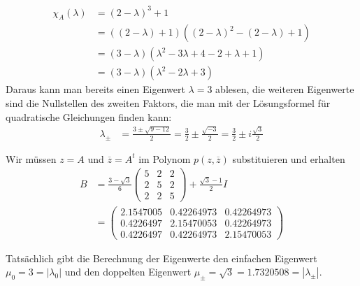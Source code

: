 \begin{loesung}
\begin{teilaufgaben}
\begin{align*}
\chi_A(\lambda)
&=
(2-\lambda)^3+1
\\
&=
((2-\lambda)+1)
((2-\lambda)^2 -(2-\lambda)+1)
\\
&=
(3-\lambda)
(\lambda^2-3\lambda +4-2+\lambda +1)
\\
&=
(3-\lambda)
(\lambda^2-2\lambda +3)
\end{align*}
Daraus kann man bereits einen Eigenwert $\lambda=3$ ablesen,
die weiteren Eigenwerte sind die Nullstellen des zweiten Faktors, die
man mit der Lösungsformel für quadratische Gleichungen finden kann:
\begin{align*}
\lambda_{\pm}
&=
\frac{3\pm\sqrt{9-12}}{2}
=
\frac{3}{2} \pm\frac{\sqrt{-3}}{2}
=
\frac{3}{2} \pm i\frac{\sqrt{3}}{2}
\end{align*}
\item
Wir müssen $z=A$ und $\overline{z}=A^t$ im Polynom $p(z,\overline{z})$
substituieren und erhalten
\begin{align*}
B
&=
\frac{3-\sqrt{3}}6 \begin{pmatrix}5&2&2\\2&5&2\\2&2&5\end{pmatrix}
+\frac{\sqrt{3}-1}{2}I
\\
&=
\begin{pmatrix}
   2.1547005&  0.42264973&  0.42264973 \\
   0.4226497&  2.15470053&  0.42264973 \\
   0.4226497&  0.42264973&  2.15470053
\end{pmatrix}
\end{align*}
\item
Tatsächlich gibt die Berechnung der Eigenwerte
den einfachen Eigenwert $\mu_0=3=|\lambda_0|$
und
den doppelten Eigenwert $\mu_{\pm} = \sqrt{3}=1.7320508=|\lambda_{\pm}|$.
\qedhere
\end{teilaufgaben}
\end{loesung}

